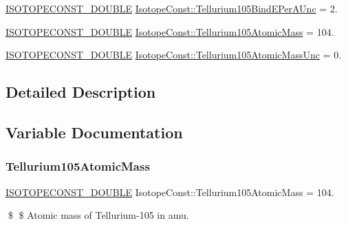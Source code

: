 \begin{DoxyCompactItemize}
\mbox{\hyperlink{group___isotope_const-_macros_ga8f45a7272ce02c0b4c65c44636ed719a}{I\+S\+O\+T\+O\+P\+E\+C\+O\+N\+S\+T\+\_\+\+D\+O\+U\+B\+LE}} \mbox{\hyperlink{group___isotope_const-_tellurium-_te105_gacb142cbee76af5a770ad400dfe380c35}{Isotope\+Const\+::\+Tellurium105\+Bind\+E\+Per\+A\+Unc}} = 2.
\item 
\mbox{\hyperlink{group___isotope_const-_macros_ga8f45a7272ce02c0b4c65c44636ed719a}{I\+S\+O\+T\+O\+P\+E\+C\+O\+N\+S\+T\+\_\+\+D\+O\+U\+B\+LE}} \mbox{\hyperlink{group___isotope_const-_tellurium-_te105_ga6ae68cacc8387ad4593ffa68e91a55b4}{Isotope\+Const\+::\+Tellurium105\+Atomic\+Mass}} = 104.
\item 
\mbox{\hyperlink{group___isotope_const-_macros_ga8f45a7272ce02c0b4c65c44636ed719a}{I\+S\+O\+T\+O\+P\+E\+C\+O\+N\+S\+T\+\_\+\+D\+O\+U\+B\+LE}} \mbox{\hyperlink{group___isotope_const-_tellurium-_te105_gacb4c6cd5055591cd8f994723b10e222a}{Isotope\+Const\+::\+Tellurium105\+Atomic\+Mass\+Unc}} = 0.
\end{DoxyCompactItemize}


\subsection{Detailed Description}


\subsection{Variable Documentation}
\mbox{\label{group___isotope_const-_tellurium-_te105_ga6ae68cacc8387ad4593ffa68e91a55b4}} 
\subsubsection{\texorpdfstring{Tellurium105\+Atomic\+Mass}{Tellurium105AtomicMass}}
{\footnotesize\ttfamily \mbox{\hyperlink{group___isotope_const-_macros_ga8f45a7272ce02c0b4c65c44636ed719a}{I\+S\+O\+T\+O\+P\+E\+C\+O\+N\+S\+T\+\_\+\+D\+O\+U\+B\+LE}} Isotope\+Const\+::\+Tellurium105\+Atomic\+Mass = 104.}

\$ \$ Atomic mass of Tellurium-\/105 in amu. \mbox{\label{group___isotope_const-_tellurium-_te105_gacb4c6cd5055591cd8f994723b10e222a}} 
